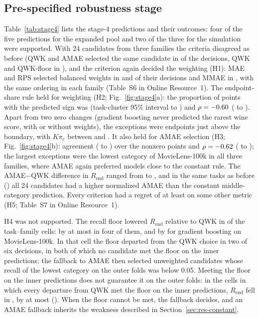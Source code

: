 \documentclass[pdflatex,sn-mathphys-ay]{sn-jnl}
\theoremstyle{thmstyleone}
\theoremstyle{thmstylethree}
\newcommand{\QWKF}{QWK-floor}
\begin{document}
\subsection{Pre-specified robustness stage}\label{sec:res-stage4}

Table~\ref{tab:stage4} lists the stage-4 predictions and their outcomes: four of the five predictions for the expanded pool and two of the three for the simulation were supported. With 24 candidates from three families the criteria disagreed as before (QWK and AMAE selected the same candidate in \HfAgrQwkAmae{} of the \DecFour{} decisions, QWK and \QWKF{} in \HfAgrQwkCon{}), and the criterion again decided the weighting (H1): MAE and RPS selected balanced weights in \BalFourMae{} and \BalFourRps{} of their decisions and MMAE in \BalFourMmae{}, with the same ordering in each family (Table~S6 in Online Resource~1). The endpoint-share rule held for weighting (H2; Fig.~\ref{fig:stage4}a): the proportion of points with the predicted sign was \HfWAgr{} (task-cluster 95\% interval \HfWAgrLo{} to \HfWAgrHi{}) and $\rho=-0.60$ (\HfWRhoLo{} to \HfWRhoHi{}). Apart from two zero changes (gradient boosting never predicted the rarest wine score, with or without weights), the \HfWExcN{} exceptions were endpoints just above the boundary, with $K\pi_c$ between \HfWExcLo{} and \HfWExcHi{}. It also held for AMAE selection (H3; Fig.~\ref{fig:stage4}b): agreement \HfAAgr{} (\HfAAgrLo{} to \HfAAgrHi{}) over the \HfANonzero{} nonzero points and $\rho=-0.62$ (\HfARhoLo{} to \HfARhoHi{}); the largest exceptions were the lowest category of MovieLens-100k in all three families, where AMAE again preferred models close to the constant rule. The AMAE$-$QWK difference in $R_{\mathrm{end}}$ ranged from \HfAmaeMin{} to \HfAmaeMax{}, and in the same \HfConstTasks{} tasks as before (\HfConstTaskList{}) all 24 candidates had a higher normalized AMAE than the constant middle-category prediction. Every criterion had a regret of at least \HfRegMinMax{} on some other metric (H5; Table~S7 in Online Resource~1).

H4 was not supported. The recall floor lowered $R_{\mathrm{end}}$ relative to QWK in \HfFloorDec{} of the \HfFloorCells{} task--family cells: by at most \HfFloorSmallMax{} in four of them, and by \HfFloorMinAbs{} for gradient boosting on MovieLens-100k. In that cell the floor departed from the QWK choice in two of six decisions, in both of which no candidate met the floor on the inner predictions; the fallback to AMAE then selected unweighted candidates whose recall of the lowest category on the outer folds was below 0.05. Meeting the floor on the inner predictions does not guarantee it on the outer folds: in the \FloorFeasCells{} cells in which every departure from QWK met the floor on the inner predictions, $R_{\mathrm{end}}$ fell in \FloorFeasNeg{}, by at most \FloorFeasMaxLoss{} (\FloorFeasWorstTask{}). When the floor cannot be met, the fallback decides, and an AMAE fallback inherits the weakness described in Section~\ref{sec:res-constant}.
\end{document}

